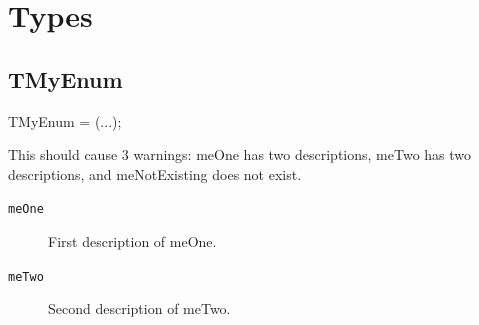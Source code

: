 \documentclass{report}
\newif\ifpdf
\begin{document}
\section{Types}
\ifpdf
\subsection*{\large{\textbf{TMyEnum}}\normalsize\hspace{1ex}\hrulefill}
\else
\subsection*{TMyEnum}
\fi
\label{warning_value_member_tags-TMyEnum}
\begin{list}{}{
\setlength{\itemindent}{0cm}
\setlength{\listparindent}{0cm}
\setlength{\leftmargin}{\evensidemargin}
\addtolength{\leftmargin}{\tmplength}
\settowidth{\labelsep}{X}
\addtolength{\leftmargin}{\labelsep}
\setlength{\labelwidth}{\tmplength}
}
\item[\textbf{Declaration}\hfill]
\ifpdf
\begin{flushleft}
\fi
\begin{ttfamily}
TMyEnum = (...);\end{ttfamily}

\ifpdf
\end{flushleft}
\fi

\par
\item[\textbf{Description}]
 





This should cause 3 warnings: meOne has two descriptions, meTwo has two descriptions, and meNotExisting does not exist.\item[\textbf{Values}]
\begin{description}
\item[\texttt{meOne}] \label{warning_value_member_tags-meOne}
\index{}
First description of meOne.
\item[\texttt{meTwo}] \label{warning_value_member_tags-meTwo}
\index{}
Second description of meTwo.
\end{description}


\end{list}
\end{document}

